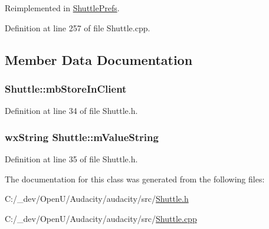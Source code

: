 Reimplemented in \hyperlink{class_shuttle_prefs_a2e040d989097665684acb3af86290010}{Shuttle\+Prefs}.



Definition at line 257 of file Shuttle.\+cpp.



\subsection{Member Data Documentation}
\subsubsection[{\texorpdfstring{mb\+Store\+In\+Client}{mbStoreInClient}}]{ Shuttle\+::mb\+Store\+In\+Client}\hypertarget{class_shuttle_aa0cbdc074660fe8fc0aa419d40e31443}{}\label{class_shuttle_aa0cbdc074660fe8fc0aa419d40e31443}


Definition at line 34 of file Shuttle.\+h.

\subsubsection[{\texorpdfstring{m\+Value\+String}{mValueString}}]{\setlength{\rightskip}{0pt plus 5cm}wx\+String Shuttle\+::m\+Value\+String}\hypertarget{class_shuttle_afc0ec90fcca258610453809155ef76e7}{}\label{class_shuttle_afc0ec90fcca258610453809155ef76e7}


Definition at line 35 of file Shuttle.\+h.



The documentation for this class was generated from the following files\+:\begin{DoxyCompactItemize}
\item 
C\+:/\+\_\+dev/\+Open\+U/\+Audacity/audacity/src/\hyperlink{_shuttle_8h}{Shuttle.\+h}\item 
C\+:/\+\_\+dev/\+Open\+U/\+Audacity/audacity/src/\hyperlink{_shuttle_8cpp}{Shuttle.\+cpp}\end{DoxyCompactItemize}
